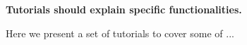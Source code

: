 {\bfseries{Tutorials should explain specific functionalities.}}

Here we present a set of tutorials to cover some of ... 